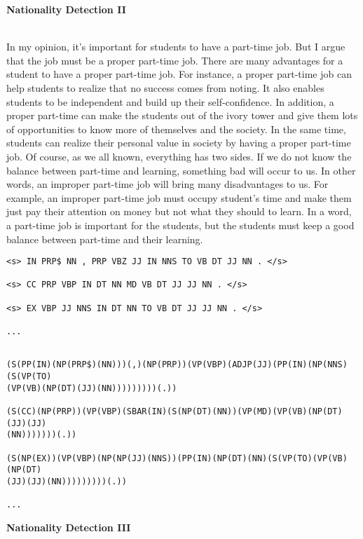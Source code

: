 \documentclass[11pt]{article}
\begin{document}
\newpage

\textbf{Nationality Detection II}

~\\
In my opinion, it's important for students to have a part-time job. But I
argue that the job must be a proper part-time job. There are many advantages
for a student to have a proper part-time job. For instance, a proper part-time
job can help students to realize that no success comes from noting. It also
enables students to be independent and build up their self-confidence. In
addition, a proper part-time can make the students out of the ivory tower and
give them lots of opportunities to know more of themselves and the society. In
the same time, students can realize their personal value in society by having
a proper part-time job.  Of course, as we all known, everything has two sides.
If we do not know the balance between part-time and learning, something bad
will occur to us. In other words, an improper part-time job will bring many
disadvantages to us. For example, an improper part-time job must occupy
student's time and make them just pay their attention on money but not
what they should to learn.  In a word, a part-time job is important for the
students, but the students must keep a good balance between part-time and
their learning.  

\begin{verbatim}
<s> IN PRP$ NN , PRP VBZ JJ IN NNS TO VB DT JJ NN . </s>

<s> CC PRP VBP IN DT NN MD VB DT JJ JJ NN . </s>

<s> EX VBP JJ NNS IN DT NN TO VB DT JJ JJ NN . </s>

...
\end{verbatim}

\begin{verbatim}

(S(PP(IN)(NP(PRP$)(NN)))(,)(NP(PRP))(VP(VBP)(ADJP(JJ)(PP(IN)(NP(NNS)(S(VP(TO)
(VP(VB)(NP(DT)(JJ)(NN)))))))))(.))

(S(CC)(NP(PRP))(VP(VBP)(SBAR(IN)(S(NP(DT)(NN))(VP(MD)(VP(VB)(NP(DT)(JJ)(JJ)
(NN)))))))(.))

(S(NP(EX))(VP(VBP)(NP(NP(JJ)(NNS))(PP(IN)(NP(DT)(NN)(S(VP(TO)(VP(VB)(NP(DT)
(JJ)(JJ)(NN)))))))))(.))

...
\end{verbatim}

\newpage

\textbf{Nationality Detection III}
\end{document}
